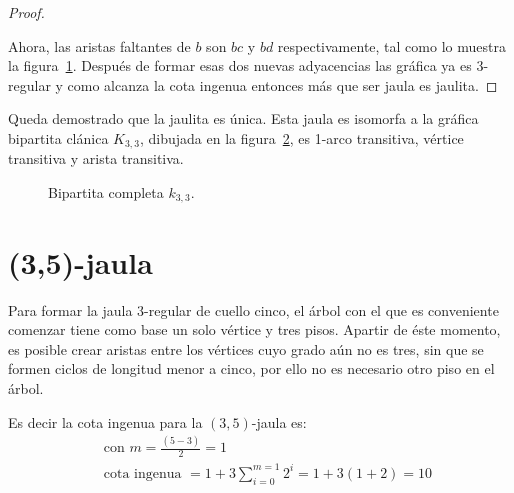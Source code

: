 \documentclass[12pt]{book}
\theoremstyle{definition}
\begin{document}
\begin{proof}
\begin{figure}[htb]
  \caption{} \label{jaula(3,4)}
\end{figure}

Ahora, las aristas faltantes de $b$ son  $bc$
y $bd$ respectivamente, tal como lo muestra la
figura~\ref{jaula(3,4)}. Después de formar esas dos nuevas adyacencias
las gráfica ya es 3-regular y como alcanza la cota ingenua entonces
más que ser jaula es
jaulita.
\end{proof}

Queda demostrado que la jaulita es única. Esta jaula es isomorfa a la
gráfica bipartita clánica  $K_{3,3}$,
dibujada en la figura~\ref{K_3,3}, es 1-arco transitiva, vértice
transitiva y arista transitiva.

\begin{figure}[htb]
  \centering
  \caption{Bipartita completa $k_{3,3}$.} \label{K_3,3}
\end{figure}


\section{(3,5)-jaula}

Para formar la jaula $3$-regular de cuello cinco, el árbol con el que
es conveniente comenzar tiene como base un solo vértice
y tres pisos. Apartir de éste momento, es posible crear aristas entre
los vértices cuyo grado aún no es tres, sin que se formen ciclos de
longitud menor a cinco, por ello no es necesario otro piso en el
árbol. 

Es decir la cota ingenua para la $(3,5)$-jaula es: 
\begin{equation*}
\begin{split}
  &\text{ con } m=\frac{(5-3)}{2}=1\\
 &\text{ cota ingenua }= 1 + 3\sum^{m=1}_{i=0} 2^i=1+3(1+2)=10
\end{split}
\end{equation*}
\end{document}
